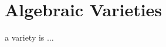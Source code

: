 \documentclass[notitlepage]{../booknotes}
\begin{document}
\maketitle
\tableofcontents
\section{Algebraic Varieties}
a variety is $\ldots$
\end{document}
